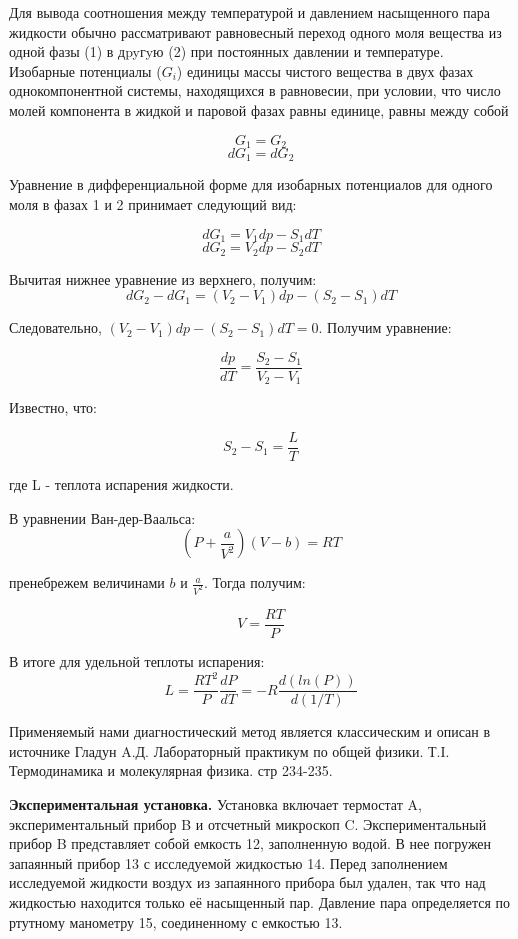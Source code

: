 \documentclass[a4paper,10pt]{article} %
\begin{document}
Для вывода соотношения между температурой и давлением насыщенного пара жидкости обычно рассматривают равновесный 
переход одного моля вещества из одной фазы (1) в дpyгyю (2) при постоянных давлении и температуре. Изобарные 
потенциалы ($G_i$) единицы массы чистого вещества в двух фазах однокомпонентной системы, находящихся в равновесии, 
при условии, что число молей компонента в жидкой и паровой фазах равны единице, равны между собой

\[G_1 = G_2\]
\[dG_1 = dG_2\]

Уравнение в дифференциальной форме для  изобарных потенциалов для одного моля в фазах 1 и 2 принимает следующий вид:

\[dG_1 = V_1dp - S_1dT\]
\[dG_2 = V_2dp - S_2dT\]

Вычитая нижнее уравнение из верхнего, получим:
\[dG_2 - dG_1 = (V_2-V_1)dp - (S_2-S_1)dT \]

Следовательно, $(V_2-V_1)dp - (S_2 - S_1)dT = 0$.
Получим уравнение:

\[\frac{dp}{dT} = \frac{S_2 - S_1}{V_2-V_1}\]

Известно, что:

\[S_2 - S_1 = \frac{L}{T}\]

где L - теплота испарения жидкости.

В уравнении Ван-дер-Ваальса:
\[(P+\frac{a}{V^2})(V-b) = RT\]

пренебрежем величинами $b$ и $\frac{a}{V^2}$. Тогда получим:

\[ V = \frac{RT}{P} \]

В итоге для удельной теплоты испарения: 
\[L = \frac{RT^2}{P}\frac{dP}{dT} = -R\frac{d(ln(P))}{d(1/T)}\]



Применяемый нами диагностический метод является классическим и описан в источнике Гладун A.Д. Лабораторный практикум 
по общей физики. Т.I. Термодинамика и молекулярная физика. стр 234-235.



\medskip

\textbf{Экспериментальная установка.}
Установка включает термостат A, экспериментальный прибор B и отсчетный микроскоп C. Экспериментальный прибор B 
представляет собой емкость 12, заполненную водой. В нее погружен запаянный прибор 13 с исследуемой жидкостью 14. 
Перед заполнением исследуемой жидкости воздух из запаянного прибора был удален, так что над жидкостью находится 
только её насыщенный пар. Давление пара определяется по ртутному манометру 15, соединенному с емкостью 13.
\end{document}
